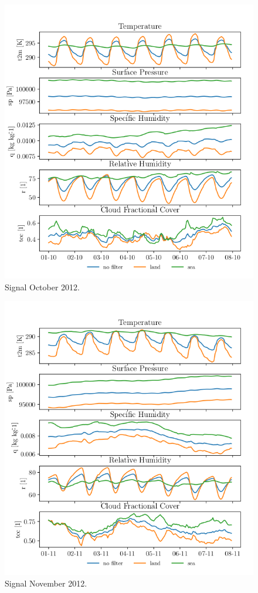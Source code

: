 
\begin{figure}[ht]
    \centering
    \includegraphics{python_figs/spatially_averaged_one_week_from_2012-10-01.png}
    \caption{Signal October 2012.}
    \label{fig:oct12}
\end{figure}


\begin{figure}[ht]
    \centering
    \includegraphics{python_figs/spatially_averaged_one_week_from_2012-11-01.png}
    \caption{Signal November 2012.}
    \label{fig:nov12}
\end{figure}

